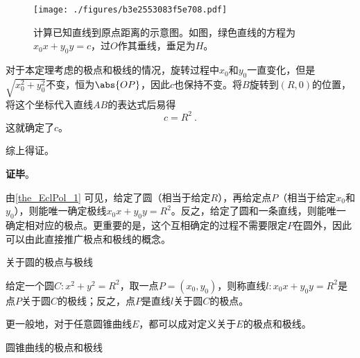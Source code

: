 \begin{figure}[ht]
\centering
\texttt{[image: ./figures/b3e2553083f5e708.pdf]}
\caption{计算已知直线到原点距离的示意图。如图，绿色直线的方程为$x_0x+y_0y=c$，过$O$作其垂线，垂足为$H$。} \label{fig_EclPol_2}
\end{figure}


对于本定理考虑的极点和极线的情况，旋转过程中$x_0$和$y_0$一直变化，但是$\sqrt{x_0^2+y_0^2}$不变，恒为$\abs{OP}$，因此$c$也保持不变。将$B$旋转到$(R, 0)$的位置，将这个坐标代入直线$AB$的表达式后易得
\begin{equation}
c=R^2~. 
\end{equation}
这就确定了$c$。

综上得证。

\textbf{证毕}。



由\autoref{the_EclPol_1} 可见，给定了圆（相当于给定$R$），再给定点$P$（相当于给定$x_0$和$y_0$），则能唯一确定极线$x_0x+y_0y=R^2$。反之，给定了圆和一条直线，则能唯一确定相对应的极点。更重要的是，这个互相确定的过程不需要限定$P$在圆外，因此可以由此直接推广极点和极线的概念。




\begin{definition}{关于圆的极点与极线}\label{def_EclPol_2}

给定一个圆$C: x^2+y^2=R^2$，取一点$P=(x_0, y_0)$，则称直线$l:x_0x+y_0y=R^2$是点$P$关于圆$C$的极线；反之，点$P$是直线$l$关于圆$C$的极点。

\end{definition}





更一般地，对于任意圆锥曲线$E$，都可以成对定义关于$E$的极点和极线。



\begin{definition}{圆锥曲线的极点和极线}

\end{definition}




















